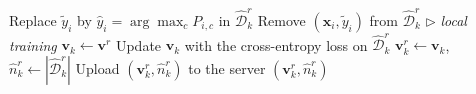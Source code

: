 \begin{algorithm}[t]
\begin{algorithmic}[1]
                        \State Replace $\tilde{y}_i$ by $\hat{y}_i = \arg\max_c P_{i,c}$ in
                               $\hat{\mathcal{D}}^{r}_k$ 
                    \Else
                        \State Remove $(\mathbf{x}_i, \tilde{y}_i)$ from $\hat{\mathcal{D}}^{r}_k$
                    \EndIf
                \EndFor
            \EndIf
            \State $\triangleright$ \textit{local training}
            \State $\mathbf{v}_k \gets \mathbf{v}^{r}$
                \State Update $\mathbf{v}_k$ with the cross-entropy loss on $\hat{\mathcal{D}}^{r}_k$
            \EndFor
            \State $\mathbf{v}^{r}_k \gets \mathbf{v}_k$, \; $\hat{n}^{r}_k \gets |\hat{\mathcal{D}}^{r}_k|$
            \State Upload $(\mathbf{v}^{r}_k, \hat{n}^{r}_k)$ to the server
        \EndFor
        \State \Return $(\mathbf{v}^{r}_k, \hat{n}^{r}_k)$
    \EndFunction
\EndFor
\end{algorithmic}
\end{algorithm}
